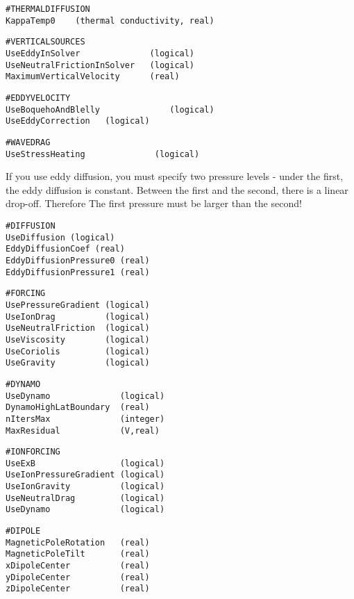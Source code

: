 \begin{verbatim}
#THERMALDIFFUSION
KappaTemp0    (thermal conductivity, real)
\end{verbatim}

\begin{verbatim}
#VERTICALSOURCES
UseEddyInSolver              (logical)
UseNeutralFrictionInSolver   (logical)
MaximumVerticalVelocity      (real)
\end{verbatim}

\begin{verbatim}
#EDDYVELOCITY
UseBoquehoAndBlelly              (logical)
UseEddyCorrection   (logical)
\end{verbatim}

\begin{verbatim}
#WAVEDRAG
UseStressHeating              (logical)
\end{verbatim}

If you use eddy diffusion, you must specify two pressure
levels - under the first, the eddy diffusion is constant.
Between the first and the second, there is a linear drop-off.
Therefore The first pressure must be larger than the second!
\begin{verbatim}
#DIFFUSION
UseDiffusion (logical)
EddyDiffusionCoef (real)
EddyDiffusionPressure0 (real)
EddyDiffusionPressure1 (real)
\end{verbatim}

\begin{verbatim}
#FORCING
UsePressureGradient (logical)
UseIonDrag          (logical)
UseNeutralFriction  (logical)
UseViscosity        (logical)
UseCoriolis         (logical)
UseGravity          (logical)
\end{verbatim}

\begin{verbatim}
#DYNAMO
UseDynamo              (logical)
DynamoHighLatBoundary  (real)
nItersMax              (integer)
MaxResidual            (V,real)
\end{verbatim}

\begin{verbatim}
#IONFORCING
UseExB                 (logical)
UseIonPressureGradient (logical)
UseIonGravity          (logical)
UseNeutralDrag         (logical)
UseDynamo              (logical)
\end{verbatim}

\begin{verbatim}
#DIPOLE
MagneticPoleRotation   (real)
MagneticPoleTilt       (real)
xDipoleCenter          (real)
yDipoleCenter          (real)
zDipoleCenter          (real)
\end{verbatim}


